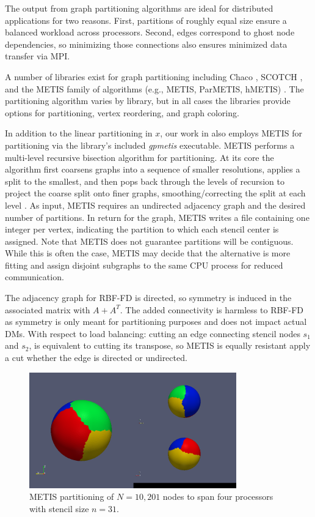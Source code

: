 \documentclass{report}
\begin{document}
The output from graph partitioning algorithms are ideal for distributed applications for two reasons. First, partitions of roughly equal size ensure a balanced workload across processors. Second, edges correspond to ghost node dependencies, so minimizing those connections also ensures minimized data transfer via MPI. 

A number of libraries exist for graph partitioning including Chaco \cite{CHACO1995}, SCOTCH \cite{SCOTCH1996}, and the METIS family of algorithms (e.g., METIS, ParMETIS, hMETIS) \cite{Karypis1999}. The partitioning algorithm varies by library, but in all cases the libraries provide options for partitioning, vertex reordering, and graph coloring.

In addition to the linear partitioning in $x$, our work in \cite{BolligRBFFDCode} also employs METIS for partitioning via the library's included \emph{gpmetis} executable. METIS performs a multi-level recursive bisection algorithm for partitioning. At its core the algorithm first coarsens graphs into a sequence of smaller resolutions, applies a split to the smallest, and then pops back through the levels of recursion to project the coarse split onto finer graphs, smoothing/correcting the split at each level \cite{Karypis1999}. As input, METIS requires an undirected adjacency graph and the desired number of partitions. 
In return for the graph, METIS writes a file containing one integer per vertex, indicating the partition to which each stencil center is assigned. Note that METIS does not guarantee partitions will be contiguous. While this is often the case, METIS may decide that the alternative is more fitting and assign disjoint subgraphs to the same CPU process for reduced communication. 

The adjacency graph for RBF-FD is directed, so symmetry is induced in the associated matrix with $A+A^T$. The added connectivity is harmless to RBF-FD as symmetry is only meant for partitioning purposes and does not impact actual DMs. With respect to load balancing: cutting an edge connecting stencil nodes $s_1$ and $s_2$, is equivalent to cutting its transpose, so METIS is equally resistant apply a cut whether the edge is directed or undirected. 

\begin{figure}
\begin{center}
\includegraphics[width=0.8\textwidth]{rbffd_methods_content/decompositions/gpmetis_decomp_sphere_4parts.png}
\caption{METIS partitioning of $N=10,201$ nodes to span four processors with stencil size $n=31$. }
\label{fig:metis_decomposed_sphere}
\end{center}
\end{figure}
\end{document}
